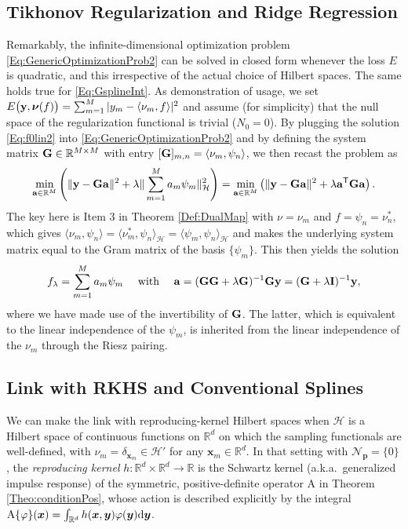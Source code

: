 \documentclass[11pt, english,english]{article}
\newcommand{\R}{ \mathbb{R}}
\newcommand{\dint}{{\rm d}}
\def\V#1{{\boldsymbol{#1}}}         %
\def\Spc#1{{\mathcal{#1}}}  %
\def\M#1{{\bf{#1}}}  %
\def\Op#1{{\mathrm{#1}}}  %
\renewcommand{\[}{\begin{equation}}
\renewcommand{\]}[1]{\label{eq:#1}\end{equation}}
\newcommand{\Tr}{\mathsf{T}}
\begin{document}
\subsection{Tikhonov Regularization and Ridge Regression}
\label{Sec:Tikhonov}
Remarkably, the infinite-dimensional optimization problem \eqref{Eq:GenericOptimizationProb2}  can be solved in closed form whenever the loss $E$ is quadratic, and this irrespective of the actual choice of Hilbert spaces. The same holds true for \eqref{Eq:GsplineInt}.
As demonstration of usage, we set $E\big(\M y, \V \nu(f)\big)=\sum_{m=1}^M |y_m -\langle \nu_m, f\rangle|^2$ and assume (for simplicity) that
the null space of the regularization functional is trivial ($N_0=0$). By plugging the solution \eqref{Eq:f0lin2} into \eqref{Eq:GenericOptimizationProb2} and by defining the system matrix
$\M G \in \R^{M \times M}$ with entry $[\M G]_{m,n}=\langle \nu_m,\psi_n \rangle$, we then recast the problem as
\begin{align*}
\min_{\M a \in  \R^M} \left(\|\M y - \M G \M a\|^2 + \lambda \|\sum_{m=1}^M a_m \psi_m\|^2_{\Spc H} \right)
=\min_{\M a \in  \R^M} \left(\|\M y - \M G \M a\|^2 + \lambda \M a^\Tr \M G \M a\right).
\end{align*} 
The key here is Item 3 in Theorem \ref{Def:DualMap}
 with $\nu=\nu_m$ and $f=\psi_n = \nu_n^\ast$,
which gives $\langle \nu_m, \psi_n\rangle=\langle \nu^\ast_m, \psi_n\rangle_{\Spc H}=\langle \psi_m, \psi_n\rangle_{\Spc H}$
and makes  the underlying system matrix equal to the
Gram matrix of the basis $\{\psi_m\}$. This then yields the solution
\begin{align}
\label{Eq:TikAbstract}
f_\lambda= \sum_{m=1}^M a_m \psi_m\quad  \mbox{ with }\quad \M a=(\M G \M G + \lambda \M G)^{-1} \M G \M y=(\M G + \lambda \M I)^{-1} \M y,
\end{align}
where we have made use of the invertibility of $\M G$. The latter, which is equivalent
to the linear independence of the $\psi_m$, is inherited from the linear independence of the $\nu_m$ through the Riesz pairing.

\subsection{Link with RKHS and Conventional Splines}
We can make the link with reproducing-kernel Hilbert spaces when $\Spc H$ is a Hilbert space of continuous functions on $\R^d$
on which the sampling functionals are well-defined, with $\nu_m=\delta_{\V x_m} \in \Spc H'$ for any $\V x_m \in \R^d$.
In that setting with $\Spc N_{\V p}=\{0\}$, the {\em reproducing kernel} $h: \R^d \times \R^d \to \R$ is the Schwartz kernel (a.k.a.\ generalized impulse response) of the symmetric, positive-definite operator $\Op A$ in Theorem \ref{Theo:conditionPos}, whose action is described explicitly by the integral $\Op A\{\varphi\}(\V x)=\int_{\R^d} h(\V x,\V y) \varphi(\V y) \dint \V y$. 
\end{document}
